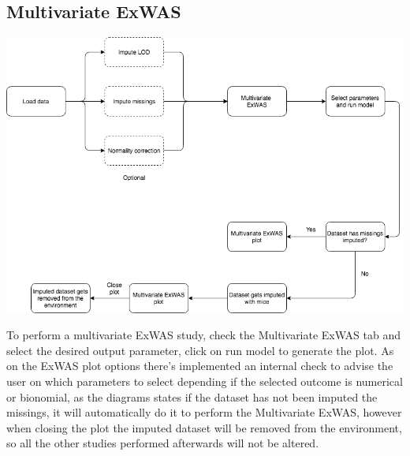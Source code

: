 \documentclass[
]{book}
\begin{document}
\hypertarget{multivariate-exwas}{%
\subsection{Multivariate ExWAS}\label{multivariate-exwas}}

\includegraphics{images/analysis8_1.png}

To perform a multivariate ExWAS study, check the Multivariate ExWAS tab and select the desired output parameter, click on run model to generate the plot. As on the ExWAS plot options there's implemented an internal check to advise the user on which parameters to select depending if the selected outcome is numerical or bionomial, as the diagrams states if the dataset has not been imputed the missings, it will automatically do it to perform the Multivariate ExWAS, however when closing the plot the imputed dataset will be removed from the environment, so all the other studies performed afterwards will not be altered.
\end{document}
